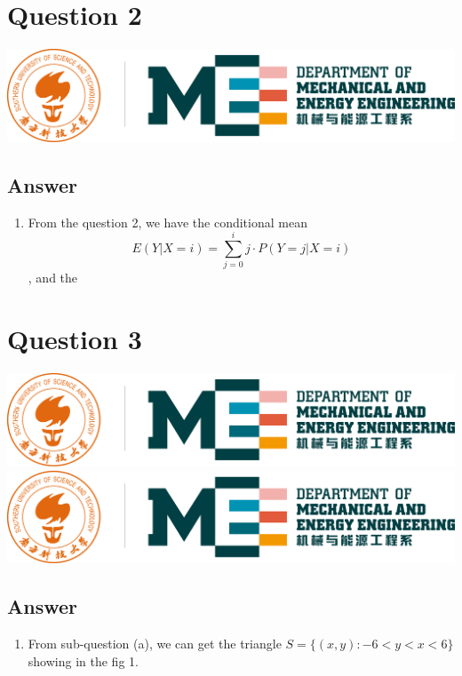 \documentclass[
	12pt, %
]{fphw}
\begin{document}
\section*{Question 2}
\begin{problem}
	\includegraphics[width=440pt]{img/logo.png}
\end{problem}
\subsection*{Answer}
\begin{enumerate} %
	\item From the question 2, we have the conditional mean $$E(Y|X=i)=\sum_{j=0}^i j\cdot P(Y=j|X=i)$$, and the
\end{enumerate}

\clearpage
\section*{Question 3}
\begin{problem}
    \includegraphics[width=440pt]{img/logo.png}\\
    \includegraphics[width=440pt]{img/logo.png}
\end{problem}
\subsection*{Answer} 
\begin{enumerate}
    \item From sub-question (a), we can get the triangle $S=\{(x,y):-6<y<x<6\}$ showing in the fig 1. 
\end{enumerate}
\end{document}

